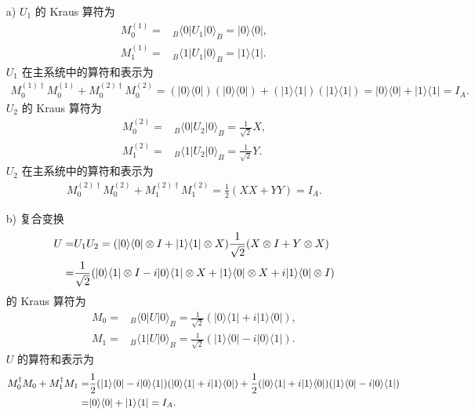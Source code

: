 \documentclass{assignment}
\begin{document}
\begin{sol}
    \begin{itemize}
        \item[a)] $U_1$ 的 Kraus 算符为
        \begin{align}
            M_0^{(1)}=&_B\langle 0\rvert U_1\lvert 0\rangle_B=\lvert 0\rangle\langle 0\rvert,\\
            M_1^{(1)}=&_B\langle 1\rvert U_1\lvert 0\rangle_B=\lvert 1\rangle\langle 1\rvert.
        \end{align}
        $U_1$ 在主系统中的算符和表示为
        \begin{align}
            M_0^{(1)\dagger}M_0^{(1)}+M_0^{(2)\dagger}M_0^{(2)}=(\lvert 0\rangle\langle 0\rvert)(\lvert 0\rangle\langle 0\rvert)+(\lvert 1\rangle\langle 1\rvert)(\lvert 1\rangle\langle 1\rvert)=\lvert 0\rangle\langle 0\rvert+\lvert 1\rangle\langle 1\rvert=I_A.
        \end{align}
        $U_2$ 的 Kraus 算符为
        \begin{align}
            M_0^{(2)}=&_B\langle 0\rvert U_2\lvert 0\rangle_B=\frac{1}{\sqrt{2}}X,\\
            M_1^{(2)}=&_B\langle 1\rvert U_2\lvert 0\rangle_B=\frac{1}{\sqrt{2}}Y.
        \end{align}
        $U_2$ 在主系统中的算符和表示为
        \begin{align}
            M_0^{(2)\dagger}M_0^{(2)}+M_1^{(2)\dagger}M_1^{(2)}=\frac{1}{2}(XX+YY)=I_A.
        \end{align}
        \item[b)] 复合变换
        \begin{align}
            \notag U=&U_1U_2=(\lvert 0\rangle\langle 0\rvert\otimes I+\lvert 1\rangle\langle 1\rvert\otimes X)\frac{1}{\sqrt{2}}(X\otimes I+Y\otimes X)\\
            =&\frac{1}{\sqrt{2}}(\lvert 0\rangle\langle 1\rvert\otimes I-i\lvert 0\rangle\langle 1\rvert\otimes X+\lvert 1\rangle\langle 0\rvert\otimes X+i\lvert 1\rangle\langle 0\rvert\otimes I)
        \end{align}
        的 Kraus 算符为
        \begin{align}
            M_0=&_B\langle 0\rvert U\lvert 0\rangle_B=\frac{1}{\sqrt{2}}(\lvert 0\rangle\langle 1\rvert+i\lvert 1\rangle\langle 0\rvert),\\
            M_1=&_B\langle 1\rvert U\lvert 0\rangle_B=\frac{1}{\sqrt{2}}(\lvert 1\rangle\langle 0\rvert-i\lvert 0\rangle\langle 1\rvert).
        \end{align}
        $U$ 的算符和表示为
        \begin{align}
            \notag M_0^{\dagger}M_0+M_1^{\dagger}M_1=&\frac{1}{2}(\lvert 1\rangle\langle 0\rvert-i\lvert 0\rangle\langle 1\rvert)(\lvert 0\rangle\langle 1\rvert+i\lvert 1\rangle\langle 0\rvert)+\frac{1}{2}(\lvert 0\rangle\langle 1\rvert+i\lvert 1\rangle\langle 0\rvert)(\lvert 1\rangle\langle 0\rvert-i\lvert 0\rangle\langle 1\rvert)\\
            =&\lvert 0\rangle\langle 0\rvert+\lvert 1\rangle\langle 1\rvert=I_A.
        \end{align}


\end{itemize}
\end{sol}
\end{document}
